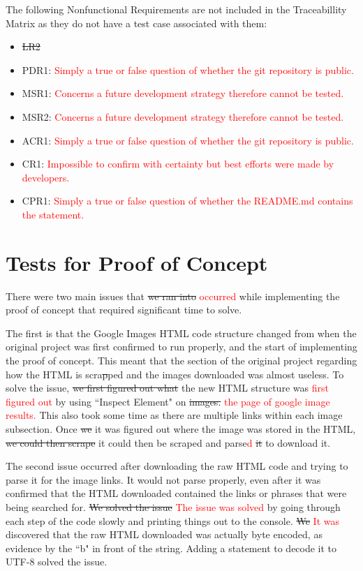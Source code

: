 \documentclass[12pt, titlepage]{article}
\begin{document}
The following Nonfunctional Requirements are not included in the Traceabillity Matrix as they do not have a test case associated with them:
\begin{itemize}
    \item \sout{LR2}
    \item PDR1: \textcolor{red}{Simply a true or false question of whether the git repository is public.}
    \item MSR1: \textcolor{red}{Concerns a future development strategy therefore cannot be tested.}
    \item MSR2: \textcolor{red}{Concerns a future development strategy therefore cannot be tested.}
    \item ACR1: \textcolor{red}{Simply a true or false question of whether the git repository is public.}
    \item CR1:  \textcolor{red}{Impossible to confirm with certainty but best efforts were made by developers.}
    \item CPR1: \textcolor{red}{Simply a true or false question of whether the README.md contains the statement.}
\end{itemize}

\section{Tests for Proof of Concept}

There were two main issues that \sout{we ran into} \textcolor{red}{occurred} while implementing the proof of concept 
that required significant time to solve.

The first is that the Google Images HTML code structure changed from when the original project was first confirmed 
to run properly, and the start of implementing the proof of concept. This meant that the section of the original 
project regarding how the HTML is scra\sout{p}ped and the images downloaded was almost useless. To solve the issue, 
\sout{we first figured out what} the new HTML structure was \textcolor{red}{first figured out} by using 
``Inspect Element" on \sout{images.} \textcolor{red}{the page of google image results.} This also took some time as 
there are multiple links within each image subsection. Once \sout{we} it was figured out where the image was 
stored in the HTML, \sout{we could then scrape} it could then be scraped and parse\textcolor{red}{d} \sout{it} to download it.

The second issue occurred after downloading the raw HTML code and trying to parse it for the image links. 
It would not parse properly, even after it was confirmed that the HTML downloaded contained the links or phrases 
that were being searched for. \sout{We solved the issue} \textcolor{red}{The issue was solved} by going through 
each step of the code slowly and printing things out to the console. \sout{We} \textcolor{red}{It was} discovered that 
the raw HTML downloaded was actually byte encoded, as evidence by the ``b" in front of the string. 
Adding a statement to decode it to UTF-8 solved the issue.
	
\end{document}
